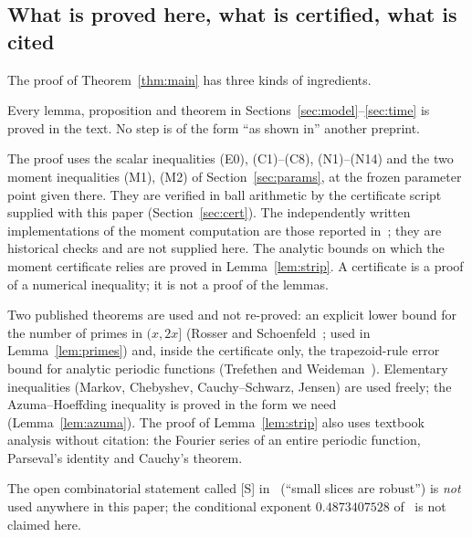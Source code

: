 \documentclass[11pt]{article}
\theoremstyle{definition}
\begin{document}
\subsection{What is proved here, what is certified, what is cited}\label{sec:status}
The proof of Theorem~\ref{thm:main} has three kinds of ingredients.
\begin{description}[leftmargin=1.5em]
\item[Written proofs.] Every lemma, proposition and theorem in Sections~\ref{sec:model}--\ref{sec:time} is proved
in the text. No step is of the form ``as shown in'' another preprint.
\item[Certified numerics.] The proof uses the scalar inequalities \textup{(E0)}, \textup{(C1)--(C8)},
\textup{(N1)--(N14)} and the
two moment inequalities \textup{(M1)}, \textup{(M2)} of Section~\ref{sec:params}, at the frozen parameter point
given there. They are verified in ball arithmetic by the certificate script supplied with this paper
(Section~\ref{sec:cert}). The independently written implementations of the moment computation are those reported
in~\cite{V}; they are historical checks and are not supplied here. The analytic bounds on which the moment certificate relies are proved in
Lemma~\ref{lem:strip}. A certificate is a proof of a numerical inequality; it is not a proof of the lemmas.
\item[Cited classical results.] Two published theorems are used and not re-proved: an explicit lower bound for the
number of primes in $(x,2x]$ (Rosser and Schoenfeld~\cite{RS}; used in Lemma~\ref{lem:primes}) and, inside the
certificate only, the trapezoid-rule error bound for analytic periodic functions (Trefethen and
Weideman~\cite{TW}). Elementary inequalities (Markov, Chebyshev, Cauchy--Schwarz, Jensen) are used freely; the
Azuma--Hoeffding inequality is proved in the form we need (Lemma~\ref{lem:azuma}). The proof of
Lemma~\ref{lem:strip} also uses textbook analysis without citation: the Fourier series of an entire periodic
function, Parseval's identity and Cauchy's theorem.
\end{description}
The open combinatorial statement called \textup{[S]} in~\cite{V} (``small slices are robust'') is \emph{not} used
anywhere in this paper; the conditional exponent $0.4873407528$ of~\cite{V} is not claimed here.
\end{document}
